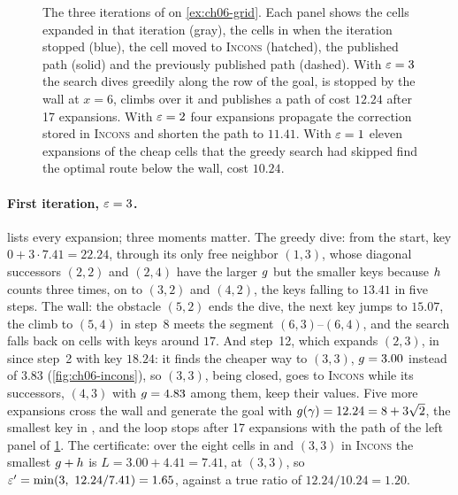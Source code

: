 \begin{figure}[tb]
  \centering
  \caption{The three iterations of \arastar on \cref{ex:ch06-grid}. Each
  panel shows the cells expanded in that iteration (gray), the cells in \Open
  when the iteration stopped (blue), the cell moved to \textsc{Incons}
  (hatched), the published path (solid) and the previously published path
  (dashed). With $\varepsilon = 3$ the search dives greedily along the row of the
  goal, is stopped by the wall at $x = 6$, climbs over it and publishes a path
  of cost $12.24$ after 17 expansions. With $\varepsilon = 2$ four expansions
  propagate the correction stored in \textsc{Incons} and shorten the path to
  $11.41$. With $\varepsilon = 1$ eleven expansions of the cheap cells that the
  greedy search had skipped find the optimal route below the wall, cost
  $10.24$.}
  \label{fig:ch06-example}
\end{figure}

\paragraph{First iteration, $\varepsilon = 3$.}
 lists every expansion; three moments matter. The greedy
dive: from the start, key $0 + 3 \cdot 7.41 = 22.24$, through its only free
neighbor $(1,3)$, whose diagonal successors $(2,2)$ and $(2,4)$ have the
larger $g$ but the smaller keys because $h$ counts three times, on
to $(3,2)$ and $(4,2)$, the keys falling to $13.41$ in five steps. The wall:
the obstacle $(5,2)$ ends the dive, the next key jumps to $15.07$, the climb
to $(5,4)$ in step~8 meets the segment $(6,3)$--$(6,4)$, and the search falls
back on cells with keys around $17$. And step~12, which expands $(2,3)$, in
\Open since step~2 with key $18.24$: it finds the cheaper way to $(3,3)$,
$g = 3.00$ instead of $3.83$ (\cref{fig:ch06-incons}), so $(3,3)$, being
closed, goes to \textsc{Incons} while its successors, $(4,3)$ with $g =
4.83$ among them, keep their values. Five more expansions cross the wall and
generate the goal with $g(\gamma) = 12.24 = 8 + 3\sqrt{2}$, the smallest
key in \Open, and the loop stops after 17 expansions with the path of the left
panel of \cref{fig:ch06-example}. The certificate: over the eight cells in
\Open and $(3,3)$ in \textsc{Incons} the smallest $g + h$ is $L =
3.00 + 4.41 = 7.41$, at $(3,3)$, so $\varepsilon' = \min(3,\ 12.24/7.41) = 1.65$,
against a true ratio of $12.24/10.24 = 1.20$.

